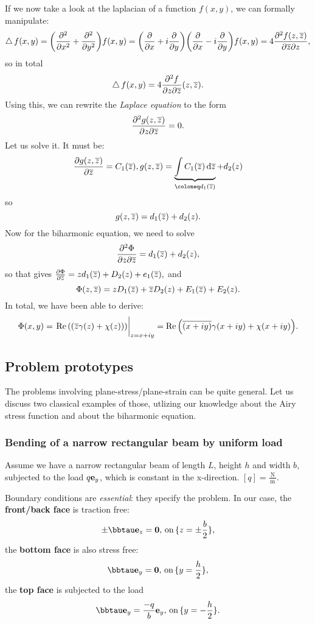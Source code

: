 \documentclass[../main.tex]{subfiles}
\begin{document}
If we now take a look at the laplacian of a function $f(x,y)$, we can formally manipulate:
\[
	\laplace f\qty(x,y) = \qty(\pdv[2]{x}+\pdv[2]{y})f\qty(x,y) = \qty(\pdv{x}+i\pdv{y})\qty(\pdv{x}-i\pdv{y})f\qty(x,y) = 4 \pdv[2]{f\qty(z,\overline{z})}{\overline{z}}{z},
\]
so in total
\[
	\laplace f\qty(x,y) = 4 \pdv[2]{f}{z}{\overline{z}}\qty(z,\overline{z}).
\]
Using this, we can rewrite the \textit{Laplace equation} to the form
\[
	\pdv[2]{g\qty(z,\overline{z})}{z}{\overline{z}} = 0.
\]
Let us solve it. It must be:
\[
	\pdv{g\qty(z,\overline{z})}{\overline{z}} = C_1\qty(\overline{z}), g\qty(z,\overline{z}) = \underbrace{\int C_1\qty(\overline{z})\dd{\overline{z}}}_{\coloneq d_1\qty(\overline{z})} + d_2\qty(z)
\]
so
\[
	g\qty(z,\overline{z}) = d_1(\overline{z}) + d_2\qty(z).
\]
Now for the biharmonic equation, we need to solve
\[
	\pdv[2]{\Phi}{z}{\overline{z}} = d_1\qty(\overline{z})+d_2\qty(z),
\]
so that gives $\pdv{\Phi}{\overline{z}} = z d_1\qty(\overline{z})+D_2(z) + e_1(\overline{z}),$ and
\[
	\Phi\qty(z,\overline{z}) = z D_1\qty(\overline{z})+\overline{z}D_2(z) + E_1(\overline{z}) + E_2\qty(z).
\]
In total, we have been able to derive:
\[
	\Phi\qty(x,y) = \eval{\Re\qty(\qty(\overline{z}\gamma(z)+\chi(z)))}_{z=x+iy} = \Re\qty(\overline{\qty(x+iy)}\gamma\qty(x+iy)+\chi\qty(x+iy)).
\]

\subsection{Problem prototypes}
\label{sec:problems}
The problems involving plane-stress/plane-strain can be quite general. Let us discuss two classical examples of those, utlizing our knowledge about the Airy stress function and about the biharmonic equation.

\subsubsection{Bending of a narrow rectangular beam by uniform load}
\label{sec:beam_uniform}
Assume we have a narrow rectangular beam of length $L$, height $h$ and width $b$, subjected to the load $q \vb{e}_y$, which is constant in the x-direction. $[q] = \frac{\, \text{N} \,}{\, \text{m} \,}$.

\begin{tikzpicture}
\end{tikzpicture}

Boundary conditions are \textit{essential}: they specify the problem. In our case, the \textbf{front/back face} is traction free:
\[
	\pm\bbtau \vb{e}_z = \vb{0}, \, \text{on} \, \{z = \pm \frac{b}{2} \},
\]
the \textbf{bottom face} is also stress free:
\[
	\bbtau\vb{e}_{y} = \vb{0}, \, \text{on} \, \{y=\frac{h}{2}\},
\]
the \textbf{top face} is subjected to the load
\[
	\bbtau\vb{e}_y = \frac{-q}{b}\vb{e}_y, \, \text{on} \, \{y=-\frac{h}{2}\}.
\]
\end{document}

